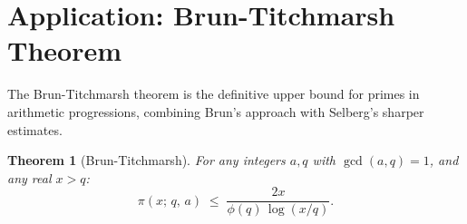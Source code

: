 \documentclass[12pt,a4paper]{amsart}
\newtheorem{theorem}{Theorem}[section]
\theoremstyle{definition}
\begin{document}
\section{Application: Brun-Titchmarsh Theorem}
\label{sec:brun_titchmarsh}

The Brun-Titchmarsh theorem is the definitive upper bound for primes in
arithmetic progressions, combining Brun's approach with Selberg's sharper estimates.

\begin{theorem}[Brun-Titchmarsh]\label{thm:brun_titchmarsh}
  For any integers $a, q$ with $\gcd(a,q) = 1$, and any real $x > q$:
  \[
    \pi(x;\,q,\,a)
    \;\leq\; \frac{2x}{\phi(q)\,\log(x/q)}.
  \]
\end{theorem}
\end{document}
